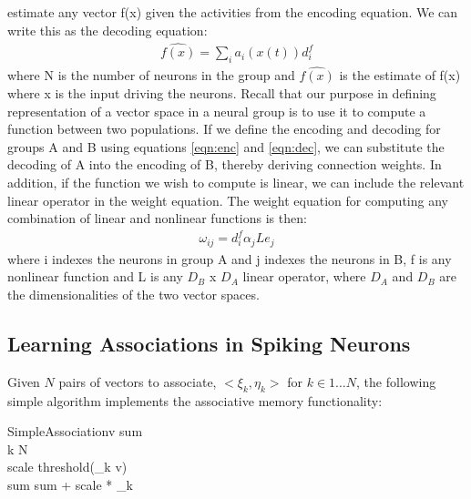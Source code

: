 \documentclass[10pt,letterpaper]{article}
\begin{document}
estimate any vector f(x) given the activities from the encoding equation. We can write
this as the decoding equation:
\begin{align}
\widehat{f(x)} = \sum_i a_i(x(t)) d^f_i \label{eqn:dec}
\end{align}
where N is the number of neurons in the group and $\widehat{f(x)}$ is the estimate of f(x) where x is the input driving the neurons. Recall that our purpose in defining representation of a vector space in a neural group
is to use it to compute a function between two populations. If we define the encoding
and decoding for groups A and B using equations \eqref{eqn:enc} and \eqref{eqn:dec}, we can substitute the
decoding of A into the encoding of B, thereby deriving connection weights. In addition, if the function we wish to compute is linear, we can include the relevant
linear operator in the weight equation. The weight equation for computing
any combination of linear and nonlinear functions is then:
\begin{align}
\omega_{ij} = d^f_i \alpha_j L e_j\label{eqn:weight}
\end{align}
where i indexes the neurons in group A and j indexes the neurons in B, f is any nonlinear function and L is any $D_B$ x $D_A$ linear operator, where $D_A$ and $D_B$ are the dimensionalities of the two vector spaces.


\subsection{Learning Associations in Spiking Neurons}
Given $N$ pairs of vectors to associate, $<\xi_k, \eta_k>$ for $k \in 1 \dots N$, the following simple algorithm implements the associative memory functionality:
 
\renewcommand{\thepseudocode}{1}

\begin{pseudocode}[ruled]{SimpleAssociation}{v}
  \label{alg:simple}
  sum \\
  \FOR k  \TO N\\
  \BEGIN
    scale \GETS threshold(\xi_k \cdot v) \\
    sum \GETS sum + scale * \eta_k\\
  \END\\
\end{pseudocode} 
\end{document}
